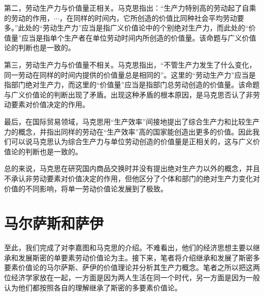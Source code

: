 第二，劳动生产力与价值量正相关。马克思指出：“生产力特别高的劳动起了自乘的劳动的作用，$\cdots$，在同样的时间内，它所创造的价值比同种社会平均劳动要多。”\cite[370]{ZhongGongZhongYangMaKeSiEnGeSiLieNingSiDaLinZhuZuoBianYiJuMaKeSiEnGeSiWenJiDi5Juan2009}此处的“劳动生产力”应当是指广义价值论中的个别绝对生产力，而此处的“价值量”应当是指单个生产者在单位劳动时间内所创造的价值量\cite[273]{CaiJiMingCongGuDianZhengZhiJingJiXueDaoZhongGuoTeSeSheHuiZhuYiZhengZhiJingJiXueJiYuZhongGuoShiJiaoDeZhengZhiJingJiXueYanBianShangCe2023}。该命题与广义价值论的判断也是一致的。

第三，劳动生产力与价值量不相关。马克思指出，“不管生产力发生了什么变化，同一劳动在同样的时间内提供的价值量总是相同的”\cite[60]{ZhongGongZhongYangMaKeSiEnGeSiLieNingSiDaLinZhuZuoBianYiJuMaKeSiEnGeSiWenJiDi5Juan2009}。这里的“劳动生产力”应当是指部门绝对生产力，而这里的“价值量”应当是指部门总劳动创造的价值量\cite[274]{CaiJiMingCongGuDianZhengZhiJingJiXueDaoZhongGuoTeSeSheHuiZhuYiZhengZhiJingJiXueJiYuZhongGuoShiJiaoDeZhengZhiJingJiXueYanBianShangCe2023}。该命题与广义价值论的判断出现了矛盾。出现这种矛盾的根本原因，是马克思否认了非劳动要素对价值决定的作用\cite[274]{CaiJiMingCongGuDianZhengZhiJingJiXueDaoZhongGuoTeSeSheHuiZhuYiZhengZhiJingJiXueJiYuZhongGuoShiJiaoDeZhengZhiJingJiXueYanBianShangCe2023}。

最后，在国际贸易领域，马克思用“生产效率”间接地提出了综合生产力和比较生产力的概念，并指出同样的劳动在“生产效率”高的国家能创造出更多的价值。因此我们可以说马克思认为综合生产力与单位劳动创造的价值量是正相关的，这与广义价值论的判断也是一致的。

总的来说，马克思在研究国内商品交换时并没有提出绝对生产力以外的概念，并且不承认非劳动要素对价值决定的作用，但他区分了个体和部门的绝对生产力变化对价值的不同影响，将单一劳动价值论发展到了极致。

\section{马尔萨斯和萨伊}

至此，我们完成了对李嘉图和马克思的介绍。不难看出，他们的经济思想主要以继承和发展斯密的单要素劳动价值论为主。接下来，笔者将介绍继承和发展了斯密多要素价值论的马尔萨斯、萨伊的价值理论并分析其生产力概念。笔者之所以把这两位经济学家放在一起，一方面是因为两人生活在同一个时代\cite[132，140]{YanZhiJieXiFangJingJiXueShuoShiJiaoChengDiErBan2013}，另一方面是因为一般认为他们都按照各自的理解继承了斯密的多要素价值论\cite[169]{CaiJiMingCongGuDianZhengZhiJingJiXueDaoZhongGuoTeSeSheHuiZhuYiZhengZhiJingJiXueJiYuZhongGuoShiJiaoDeZhengZhiJingJiXueYanBianShangCe2023}。

